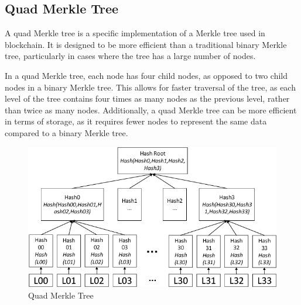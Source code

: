 \subsection{Quad Merkle Tree}
A quad Merkle tree is a specific implementation of a Merkle tree used in blockchain. It is designed to be more efficient than a traditional binary Merkle tree, particularly in cases where the tree has a large number of nodes.

In a quad Merkle tree, each node has four child nodes, as opposed to two child nodes in a binary Merkle tree. This allows for faster traversal of the tree, as each level of the tree contains four times as many nodes as the previous level, rather than twice as many nodes. Additionally, a quad Merkle tree can be more efficient in terms of storage, as it requires fewer nodes to represent the same data compared to a binary Merkle tree.

\begin{figure}[H]
    \centering
    \includegraphics[scale=0.8]{figures/Quad Merkle Tree.png}
    \caption{Quad Merkle Tree}
 
\end{figure}